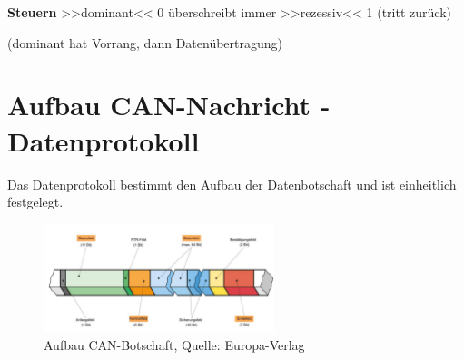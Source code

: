 \textbf{Steuern} >>dominant<< 0 überschreibt immer >>rezessiv<< 1 (tritt
zurück)

(dominant hat Vorrang, dann Datenübertragung)

\newpage

\section{Aufbau CAN-Nachricht -
Datenprotokoll}\label{aufbau-can-nachricht-datenprotokoll}

Das Datenprotokoll bestimmt den Aufbau der Datenbotschaft und ist
einheitlich festgelegt.

\begin{figure}[!ht]%
\centering
\includegraphics[width=0.6\textwidth]{images/CAN-Bus/CAN-Bus-1.pdf}
\caption{Aufbau CAN-Botschaft, Quelle: Europa-Verlag}
\end{figure}

